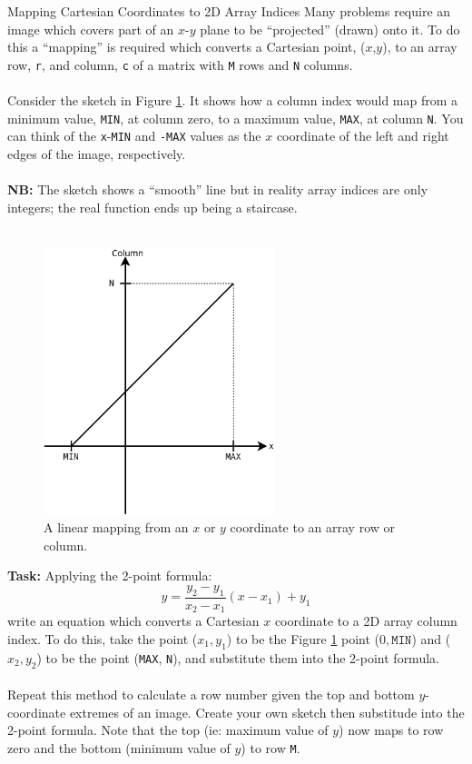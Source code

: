 \documentclass{lab}
\begin{document}
\pagebreak
\begin{task}{Mapping Cartesian Coordinates to 2D Array Indices}{}
Many problems require an image which covers part of an $x$-$y$ plane to be ``projected'' (drawn) onto it. To do this a ``mapping'' is required which converts a Cartesian point, ($x$,$y$), to an array row, \texttt{r}, and column, \texttt{c} of a matrix with \texttt{M} rows and \texttt{N} columns.
\\~\\
Consider the sketch in Figure \ref{fig:mapping}. It shows how a column index would map from a minimum value, \texttt{MIN}, at column zero, to a maximum value, \texttt{MAX}, at column \texttt{N}. You can think of the \texttt{x}-\texttt{MIN} and \texttt{-MAX} values as the $x$ coordinate of the left and right edges of the image, respectively.
\\~\\
\textbf{NB:} The sketch shows a ``smooth'' line but in reality array indices are only integers; the real function ends up being a staircase.
\\~\\
\begin{figure}[H]
\begin{center}
\includegraphics[width=0.6\textwidth]{mapping.png}
\end{center}
\caption{A linear mapping from an $x$ or $y$ coordinate to an array row or column.}\label{fig:mapping}
\end{figure}
\textbf{Task:} Applying the 2-point formula:
\begin{equation}
y = \frac{y_2 - y_1}{x_2 - x_1}(x-x_1)+y_1
\end{equation}
write an equation which converts a Cartesian $x$ coordinate to a 2D array column index. To do this, take the point ($x_1,y_1$) to be the Figure \ref{fig:mapping} point ($0,\texttt{MIN}$) and ($x_2,y_2$) to be the point (\texttt{MAX}, \texttt{N}), and substitute them into the 2-point formula.
\\~\\
Repeat this method to calculate a row number given the top and bottom $y$-coordinate extremes of an image. Create your own sketch then substitude into the 2-point formula. Note that the top (ie: maximum value of $y$) now maps to row zero and the bottom (minimum value of $y$) to row \texttt{M}.
\end{task}
\end{document}
